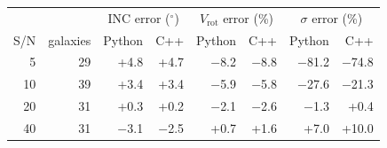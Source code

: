 \begin{tabular}{r r rr rr rr}
\toprule
 & & \multicolumn{2}{c}{INC error ($^\circ$)} & \multicolumn{2}{c}{$V_\mathrm{rot}$ error (\%)} & \multicolumn{2}{c}{$\sigma$ error (\%)} \\
S/N & galaxies & Python & C++ & Python & C++ & Python & C++ \\
\midrule
5 & 29 & +4.8 & +4.7 & $-$8.2 & $-$8.8 & $-$81.2 & $-$74.8 \\
10 & 39 & +3.4 & +3.4 & $-$5.9 & $-$5.8 & $-$27.6 & $-$21.3 \\
20 & 31 & +0.3 & +0.2 & $-$2.1 & $-$2.6 & $-$1.3 & +0.4 \\
40 & 31 & $-$3.1 & $-$2.5 & +0.7 & +1.6 & +7.0 & +10.0 \\
\bottomrule
\end{tabular}
